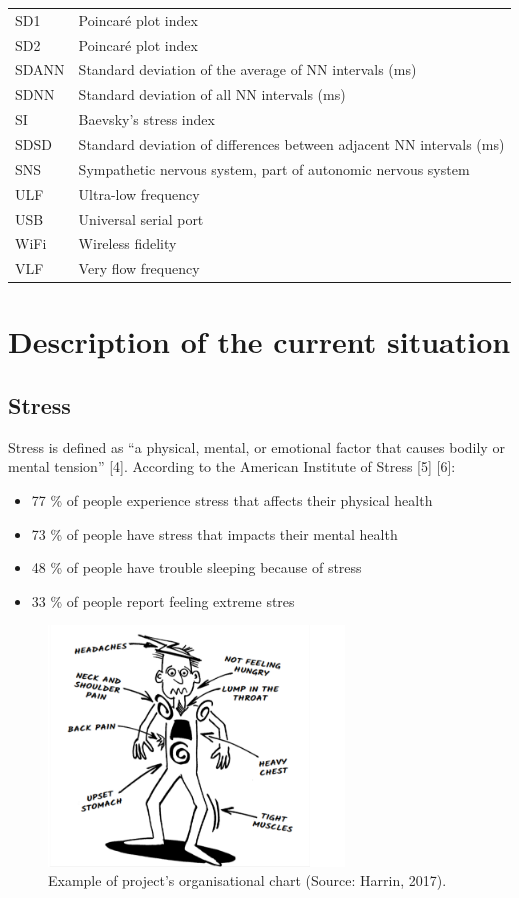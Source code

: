 \documentclass{article}
\begin{document}
\begin{table}[h]
{\begin{tabular}{p{2cm} p{9cm}}
SD1 & Poincaré plot index \\
SD2 & Poincaré plot index \\
SDANN & Standard deviation of the average of NN intervals (ms) \\
SDNN & Standard deviation of all NN intervals (ms) \\
SI & Baevsky’s stress index \\
SDSD & Standard deviation of differences between adjacent NN intervals (ms) \\
SNS & Sympathetic nervous system, part of autonomic nervous system \\
ULF & Ultra-low frequency \\
USB & Universal serial port \\
WiFi & Wireless fidelity \\
VLF & Very flow frequency \\
\end{tabular}
}
\end{table}

\pagebreak

\section{Description of the current situation}
\subsection{Stress}
Stress is defined as “a physical, mental, or emotional factor that causes bodily or mental
tension” [4]. According to the American Institute of Stress [5] [6]:

\begin{itemize}
\item 77 \% of people experience stress that affects their physical health
\item 73 \% of people have stress that impacts their mental health
\item 48 \% of people have trouble sleeping because of stress
\item 33 \% of people report feeling extreme stres
\end{itemize}

\begin{figure}[h]
  \centering
  \includegraphics[width=0.7\textwidth]{sick.png}
  \caption{ Example of project's organisational chart (Source: Harrin, 2017).}
  \label{harrin}
\end{figure}
\end{document}
